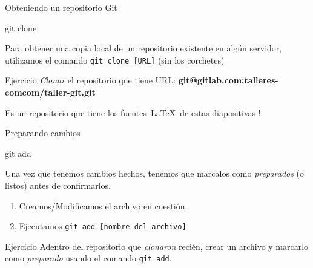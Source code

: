 \begin{frame}[t]{Obteniendo un repositorio Git}

    \begin{comando}
        git clone
    \end{comando}

    \pause
	\begin{block}{}
        Para obtener una copia local de un repositorio existente en algún servidor,
        utilizamos el comando \texttt{git clone [URL]} (sin los corchetes)
    \end{block}

    \pause
    \vspace{1em}
    \begin{ejercicio}{Ejercicio}
        \textit{Clonar} el repositorio que tiene URL: \textbf{git@gitlab.com:talleres-comcom/taller-git.git}

        \vspace{0.5em}
        Es un repositorio que tiene los fuentes\ \LaTeX\ de estas diapositivas !
    \end{ejercicio}
\end{frame}

\begin{frame}[t]{Preparando cambios}
    \begin{comando}
        git add
    \end{comando}

    \pause
    \begin{block}{}
        Una vez que tenemos cambios hechos, tenemos que marcalos como \textit{preparados} (o listos) antes de confirmarlos.
        \begin{enumerate}
            \item Creamos/Modificamos el archivo en cuestión.
            \item Ejecutamos \texttt{git add [nombre del archivo]}
        \end{enumerate}
    \end{block}

    \pause
    \vspace{1em}
    \begin{ejercicio}{Ejercicio}
        Adentro del repositorio que \textit{clonaron} recién, crear un archivo y
        marcarlo como \textit{preparado} usando el comando \texttt{git add}.
    \end{ejercicio}
\end{frame}

